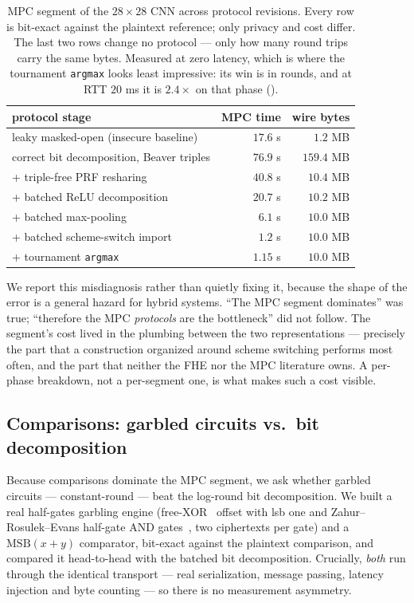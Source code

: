 \documentclass[11pt]{article}
\theoremstyle{plain}
\theoremstyle{definition}
\theoremstyle{remark}
\newcommand{\bt}[1]{\texttt{#1}}
\begin{document}
\begin{table}[t]
\centering
\caption{MPC segment of the $28\times28$ CNN across protocol revisions. Every
row is bit-exact against the plaintext reference; only privacy and cost
differ. The last two rows change no protocol --- only how many round trips
carry the same bytes. Measured at zero latency, which is where the tournament
\bt{argmax} looks least impressive: its win is in rounds, and at RTT $20$ ms
it is $2.4\times$ on that phase ().}
\label{tab:mpc}
\begin{tabular}{@{}lrr@{}}
\toprule
protocol stage & MPC time & wire bytes \\
\midrule
leaky masked-open (insecure baseline) & $17.6$ s & $1.2$ MB \\
correct bit decomposition, Beaver triples & $76.9$ s & $159.4$ MB \\
\quad + triple-free PRF resharing & $40.8$ s & $10.4$ MB \\
\quad + batched ReLU decomposition & $20.7$ s & $10.2$ MB \\
\quad + batched max-pooling & $6.1$ s & $10.0$ MB \\
\quad + batched scheme-switch import & $1.2$ s & $10.0$ MB \\
\quad + tournament \bt{argmax} & $\mathbf{1.15}$ s & $10.0$ MB \\
\bottomrule
\end{tabular}
\end{table}

We report this misdiagnosis rather than quietly fixing it, because the shape
of the error is a general hazard for hybrid systems. ``The MPC segment
dominates'' was true; ``therefore the MPC \emph{protocols} are the
bottleneck'' did not follow. The segment's cost lived in the plumbing between
the two representations --- precisely the part that a construction organized
around scheme switching performs most often, and the part that neither the
FHE nor the MPC literature owns. A per-phase breakdown, not a per-segment
one, is what makes such a cost visible.

\subsection{Comparisons: garbled circuits vs.\ bit decomposition}\label{sec:gc}

Because comparisons dominate the MPC segment, we ask whether garbled circuits
--- constant-round --- beat the log-round bit decomposition. We built a real
half-gates garbling engine (free-XOR~\cite{FreeXOR} offset with lsb one and
Zahur--Rosulek--Evans half-gate AND gates~\cite{HalfGates}, two ciphertexts
per gate) and a $\mathrm{MSB}(x+y)$ comparator, bit-exact against the
plaintext comparison, and compared it head-to-head with the batched bit
decomposition. Crucially, \emph{both} run through the identical transport ---
real serialization, message passing, latency injection and byte counting ---
so there is no measurement asymmetry.
\end{document}
